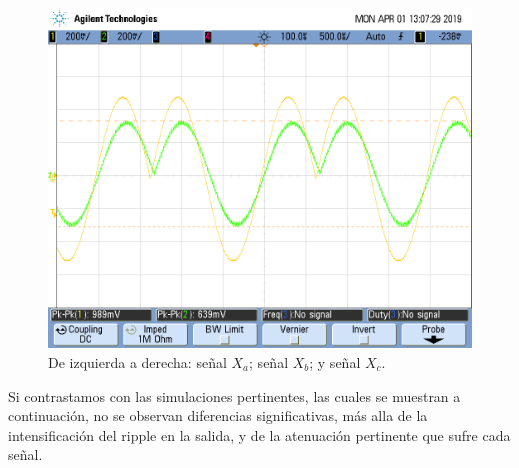 \documentclass[../../ASSD_TP1_G7.tex]{subfiles}
\begin{document}
\begin{figure}[H]
\centering{}\includegraphics[scale=0.25]{Imagenes/ej_6_b_}\caption{De izquierda a derecha: señal $X_{a}$; señal $X_{b}$; y señal $X_{c}$.}
\end{figure}

Si contrastamos con las simulaciones pertinentes, las cuales se muestran
a continuación, no se observan diferencias significativas, más alla
de la intensificación del ripple en la salida, y de la atenuación
pertinente que sufre cada señal.
\end{document}
